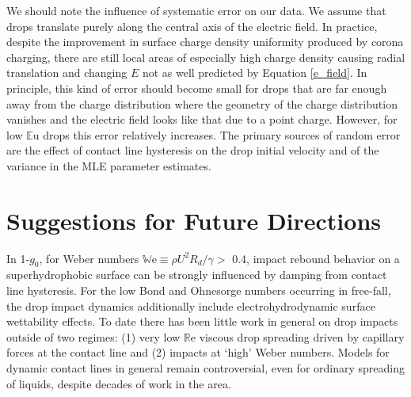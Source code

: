 \documentclass[12pt,a4paper,oneside]{book}
\begin{document}
We should note the influence of systematic error on our data. We assume that drops translate purely along the central axis of the electric field. In practice, despite the improvement in surface charge density uniformity produced by corona charging, there are still local areas of especially high charge density causing radial translation and changing $E$ not as well predicted by Equation \ref{e_field}.  In principle, this kind of error should become small for drops that are far enough away from the charge distribution where the geometry of the charge distribution vanishes and the electric field looks like that due to a point charge. However, for low $\mathbb{E}\mbox{u}$ drops this error relatively increases. The primary sources of random error are the effect of contact line hysteresis on the drop initial velocity and of the variance in the MLE parameter estimates.

\section{Suggestions for Future Directions}
In 1-$g_0$, for Weber numbers $\mathbb{W}\mbox{e} \equiv \rho U^2 R_d/\gamma >$ 0.4, impact rebound behavior on a superhydrophobic surface can be strongly influenced by damping from contact line hysteresis. For the low Bond and Ohnesorge numbers occurring in free-fall, the drop impact dynamics additionally include electrohydrodynamic surface wettability effects. To date there has been little work in general on drop impacts outside of two regimes: (1) very low $\mathbb{R}\mbox{e}$ viscous drop spreading driven by capillary forces at the contact line and (2) impacts at `high' Weber numbers. Models for dynamic contact lines in general remain controversial, even for ordinary spreading of liquids, despite decades of work in the area. 
\end{document}
